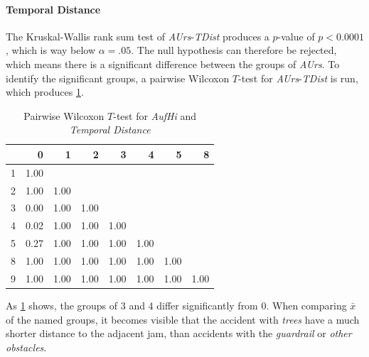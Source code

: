 \paragraph{Temporal Distance}

The Kruskal-Wallis rank sum test of \textit{AUrs}-\textit{TDist} produces a $p$-value of $p < 
0.0001$, which is way below $\alpha=.05$. The null hypothesis can therefore be rejected, which means there is a significant difference between the groups of \textit{AUrs}. To identify the significant groups, a pairwise Wilcoxon $T$-test for \textit{AUrs}-\textit{TDist} is run, which produces \cref{tbl:wilcoxon_baysis_matched_AufHi_TDist}.
\begin{table}[ht]
	\tiny
	\centering
    \begin{tabular}{rrrrrrrr}
        \toprule
        & 0 & 1 & 2 & 3 & 4 & 5 & 8 \\ 
        \midrule
        1 & 1.00 &  &  &  &  &  &  \\ 
        2 & 1.00 & 1.00 &  &  &  &  &  \\ 
        3 & 0.00 & 1.00 & 1.00 &  &  &  &  \\ 
        4 & 0.02 & 1.00 & 1.00 & 1.00 &  &  &  \\ 
        5 & 0.27 & 1.00 & 1.00 & 1.00 & 1.00 &  &  \\ 
        8 & 1.00 & 1.00 & 1.00 & 1.00 & 1.00 & 1.00 &  \\ 
        9 & 1.00 & 1.00 & 1.00 & 1.00 & 1.00 & 1.00 & 1.00 \\ 
        \bottomrule
      \end{tabular}
	\caption{Pairwise Wilcoxon $T$-test for \textit{AufHi} and \textit{Temporal Distance}}
	\label{tbl:wilcoxon_baysis_matched_AufHi_TDist}
\end{table}
As \cref{tbl:wilcoxon_baysis_matched_AufHi_TDist} shows, the groups of 3 and 4 differ significantly from 0. When comparing $\bar{x}$ of the named groups, it becomes visible that the accident with \textit{trees} have a much shorter distance to the adjacent jam, than accidents with the \textit{guardrail} or \textit{other obstacles}.
